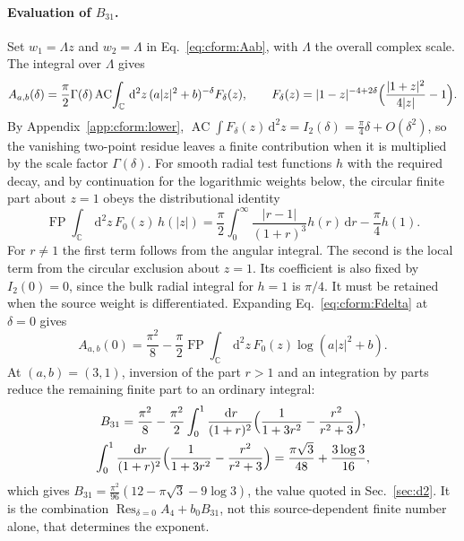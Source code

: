 \documentclass[11pt,a4paper]{article}
\numberwithin{equation}{section}
\newcommand{\dd}{\,\mathrm d}
\newcommand{\AC}{\operatorname{AC}}
\newcommand{\FP}{\operatorname{FP}}
\newcommand{\Res}{\operatorname*{Res}_{\delta=0}}
\begin{document}
\paragraph{Evaluation of $B_{31}$.} Set $w_1=\Lambda z$ and $w_2=\Lambda$ in Eq.~\eqref{eq:cform:Aab}, with $\Lambda$
the overall complex scale. The integral over $\Lambda$ gives
\begin{equation}
 A_{a,b}(\delta)=\frac\pi2\Gamma(\delta)\AC\!\int_{\mathbb C}\dd^2z\,(a|z|^2+b)^{-\delta}F_\delta(z),\qquad
 F_\delta(z)=|1-z|^{-4+2\delta}\Bigl(\frac{|1+z|^2}{4|z|}-1\Bigr).
 \label{eq:cform:Fdelta}
\end{equation}
By Appendix~\ref{app:cform:lower}, $\AC\!\int F_\delta(z)\dd^2z=I_2(\delta)=\frac\pi4\delta+O(\delta^2)$, so the
vanishing two-point residue leaves a finite contribution when it is multiplied by the scale factor $\Gamma(\delta)$.
For smooth radial test functions $h$ with the required decay, and by continuation for the logarithmic weights below,
the circular finite part about $z=1$ obeys the distributional identity
\begin{equation}
 \FP\!\int_{\mathbb C}\dd^2z\,F_0(z)\,h(|z|)=\frac\pi2\int_0^\infty\frac{|r-1|}{(1+r)^3}h(r)\dd r-\frac\pi4h(1).
 \label{eq:cform:radialfp}
\end{equation}
For $r\ne1$ the first term follows from the angular integral. The second is the local term from the circular exclusion
about $z=1$. Its coefficient is also fixed by $I_2(0)=0$, since the bulk radial integral for $h=1$ is $\pi/4$. It must
be retained when the source weight is differentiated. Expanding Eq.~\eqref{eq:cform:Fdelta} at $\delta=0$ gives
\begin{equation}
 A_{a,b}(0)=\frac{\pi^2}{8}-\frac\pi2\FP\!\int_{\mathbb C}\dd^2z\,F_0(z)\log(a|z|^2+b).
 \label{eq:cform:Aab0}
\end{equation}
At $(a,b)=(3,1)$, inversion of the part $r>1$ and an integration by parts reduce the remaining finite part to an
ordinary integral:
\begin{gather}
 B_{31}=\frac{\pi^2}{8}-\frac{\pi^2}{2}\int_0^1\frac{\dd r}{(1+r)^2}\Bigl(\frac1{1+3r^2}-\frac{r^2}{r^2+3}\Bigr),\notag\\
 \int_0^1\frac{\dd r}{(1+r)^2}\Bigl(\frac1{1+3r^2}-\frac{r^2}{r^2+3}\Bigr)=\frac{\pi\sqrt3}{48}+\frac{3\log3}{16},
\end{gather}
which gives $B_{31}=\frac{\pi^2}{96}(12-\pi\sqrt3-9\log3)$, the value quoted in Sec.~\ref{sec:d2}. It is the
combination $\Res A_4+b_0B_{31}$, not this source-dependent finite number alone, that determines the exponent.
\end{document}

